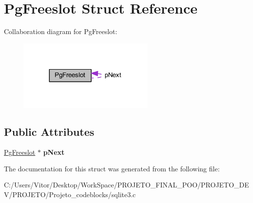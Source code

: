 \hypertarget{struct_pg_freeslot}{\section{Pg\-Freeslot Struct Reference}
\label{struct_pg_freeslot}
}


Collaboration diagram for Pg\-Freeslot\-:\nopagebreak
\begin{figure}[H]
\begin{center}
\leavevmode
\includegraphics[width=191pt]{struct_pg_freeslot__coll__graph}
\end{center}
\end{figure}
\subsection*{Public Attributes}
\begin{DoxyCompactItemize}
\item 
\hypertarget{struct_pg_freeslot_ac38a6e51f86c650fb943585d7b6c8b70}{\hyperlink{struct_pg_freeslot}{Pg\-Freeslot} $\ast$ {\bfseries p\-Next}}\label{struct_pg_freeslot_ac38a6e51f86c650fb943585d7b6c8b70}

\end{DoxyCompactItemize}


The documentation for this struct was generated from the following file\-:\begin{DoxyCompactItemize}
\item 
C\-:/\-Users/\-Vitor/\-Desktop/\-Work\-Space/\-P\-R\-O\-J\-E\-T\-O\-\_\-\-F\-I\-N\-A\-L\-\_\-\-P\-O\-O/\-P\-R\-O\-J\-E\-T\-O\-\_\-\-D\-E\-V/\-P\-R\-O\-J\-E\-T\-O/\-Projeto\-\_\-codeblocks/sqlite3.\-c\end{DoxyCompactItemize}
